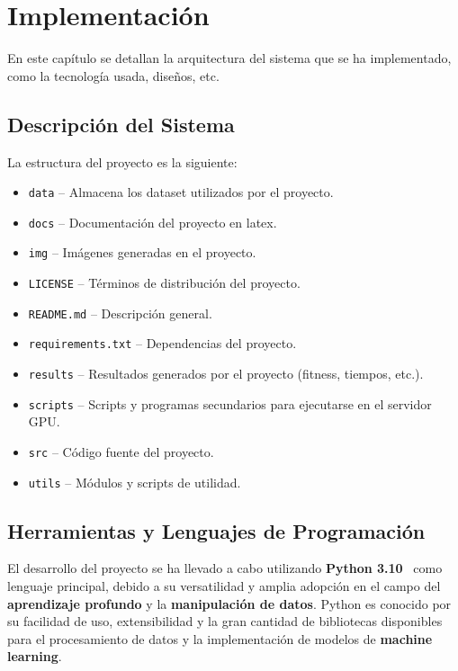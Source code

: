 \chapter{Implementación}\label{ch:implementacion}
En este capítulo se detallan la arquitectura del sistema que se ha implementado, como la tecnología usada, diseños, etc.

\section{Descripción del Sistema}\label{sec:descripcion-del-sistema}
La estructura del proyecto es la siguiente:
\begin{itemize}
    \item \texttt{data} -- Almacena los dataset utilizados por el proyecto.
    \item \texttt{docs} -- Documentación del proyecto en latex.
    \item \texttt{img} -- Imágenes generadas en el proyecto.
    \item \texttt{LICENSE} -- Términos de distribución del proyecto.
    \item \texttt{README.md} -- Descripción general.
    \item \texttt{requirements.txt} -- Dependencias del proyecto.
    \item \texttt{results} -- Resultados generados por el proyecto (fitness, tiempos, etc.).
    \item \texttt{scripts} -- Scripts y programas secundarios para ejecutarse en el servidor GPU\@.
    \item \texttt{src} -- Código fuente del proyecto.
    \item \texttt{utils} -- Módulos y scripts de utilidad.
\end{itemize}

\section{Herramientas y Lenguajes de Programación}\label{sec:herramientas-y-lenguajes-de-programacion}
El desarrollo del proyecto se ha llevado a cabo utilizando \textbf{Python 3.10}~\cite{} como lenguaje principal,
debido a su versatilidad y amplia adopción en el campo del \textbf{aprendizaje profundo} y la
\textbf{manipulación de datos}.
Python es conocido por su facilidad de uso, extensibilidad y la gran cantidad de bibliotecas disponibles para el
procesamiento de datos y la implementación de modelos de \textbf{machine learning}. \\[6pt]

